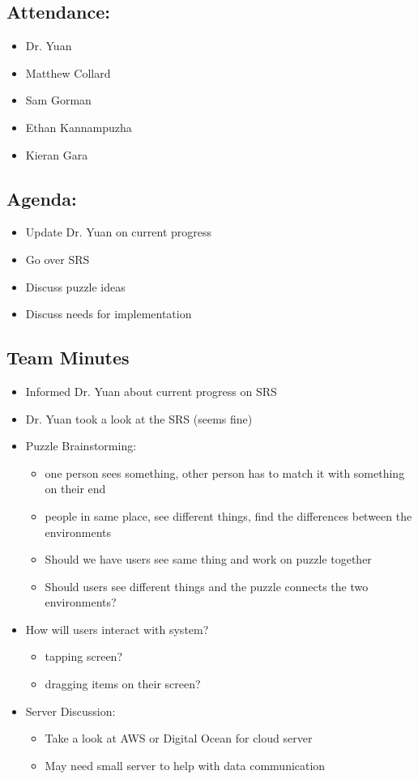 \documentclass{article}
\begin{document}
\subsection*{Attendance:}
\begin{itemize}
    \item Dr. Yuan
    \item Matthew Collard
    \item Sam Gorman
    \item Ethan Kannampuzha
    \item Kieran Gara
\end{itemize}

\subsection*{Agenda:}
\begin{itemize}
    \item Update Dr. Yuan on current progress
    \item Go over SRS
    \item Discuss puzzle ideas
    \item Discuss needs for implementation
\end{itemize}

\subsection*{Team Minutes}

\begin{itemize}
    \item Informed Dr. Yuan about current progress on SRS
    \item Dr. Yuan took a look at the SRS (seems fine)
    \item Puzzle Brainstorming:
    \begin{itemize}
        \item one person sees something, other person has to match it with something on their end
        \item people in same place, see different things, find the differences between the environments
        \item Should we have users see same thing and work on puzzle together
        \item Should users see different things and the puzzle connects the two environments?
    \end{itemize}
    \item How will users interact with system?
        \begin{itemize}
            \item tapping screen?
            \item dragging items on their screen?
        \end{itemize}
    \item Server Discussion:
    \begin{itemize}
        \item Take a look at AWS or Digital Ocean for cloud server
        \item May need small server to help with data communication
    \end{itemize}
\end{itemize}
\end{document}
